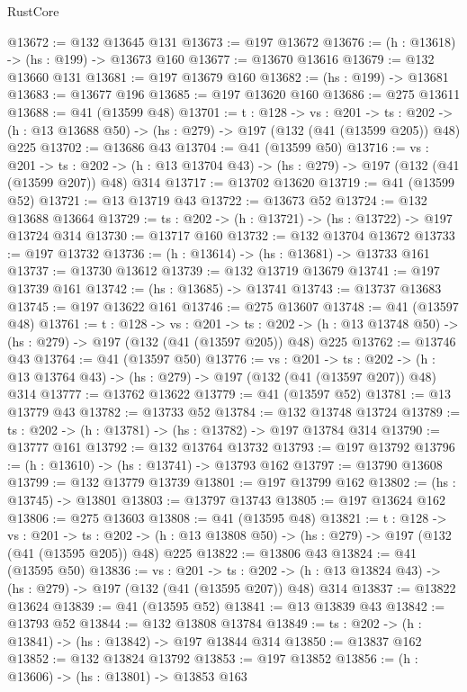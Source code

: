 \begin{lexlean}{RustCore}
\begin{coremodule}
@13672 := @132 @13645 @131
@13673 := @197 @13672
@13676 := (h : @13618) -> (hs : @199) -> @13673 @160
@13677 := @13670 @13616
@13679 := @132 @13660 @131
@13681 := @197 @13679 @160
@13682 := (hs : @199) -> @13681
@13683 := @13677 @196
@13685 := @197 @13620 @160
@13686 := @275 @13611
@13688 := @41 (@13599 @48)
@13701 := {t : @128} ->
  {vs : @201} ->
  {ts : @202} -> (h : @13 @13688 @50) -> (hs : @279) -> @197 (@132 (@41 (@13599 @205)) @48) @225
@13702 := @13686 @43
@13704 := @41 (@13599 @50)
@13716 := {vs : @201} ->
  {ts : @202} -> (h : @13 @13704 @43) -> (hs : @279) -> @197 (@132 (@41 (@13599 @207)) @48) @314
@13717 := @13702 @13620
@13719 := @41 (@13599 @52)
@13721 := @13 @13719 @43
@13722 := @13673 @52
@13724 := @132 @13688 @13664
@13729 := {ts : @202} -> (h : @13721) -> (hs : @13722) -> @197 @13724 @314
@13730 := @13717 @160
@13732 := @132 @13704 @13672
@13733 := @197 @13732
@13736 := (h : @13614) -> (hs : @13681) -> @13733 @161
@13737 := @13730 @13612
@13739 := @132 @13719 @13679
@13741 := @197 @13739 @161
@13742 := (hs : @13685) -> @13741
@13743 := @13737 @13683
@13745 := @197 @13622 @161
@13746 := @275 @13607
@13748 := @41 (@13597 @48)
@13761 := {t : @128} ->
  {vs : @201} ->
  {ts : @202} -> (h : @13 @13748 @50) -> (hs : @279) -> @197 (@132 (@41 (@13597 @205)) @48) @225
@13762 := @13746 @43
@13764 := @41 (@13597 @50)
@13776 := {vs : @201} ->
  {ts : @202} -> (h : @13 @13764 @43) -> (hs : @279) -> @197 (@132 (@41 (@13597 @207)) @48) @314
@13777 := @13762 @13622
@13779 := @41 (@13597 @52)
@13781 := @13 @13779 @43
@13782 := @13733 @52
@13784 := @132 @13748 @13724
@13789 := {ts : @202} -> (h : @13781) -> (hs : @13782) -> @197 @13784 @314
@13790 := @13777 @161
@13792 := @132 @13764 @13732
@13793 := @197 @13792
@13796 := (h : @13610) -> (hs : @13741) -> @13793 @162
@13797 := @13790 @13608
@13799 := @132 @13779 @13739
@13801 := @197 @13799 @162
@13802 := (hs : @13745) -> @13801
@13803 := @13797 @13743
@13805 := @197 @13624 @162
@13806 := @275 @13603
@13808 := @41 (@13595 @48)
@13821 := {t : @128} ->
  {vs : @201} ->
  {ts : @202} -> (h : @13 @13808 @50) -> (hs : @279) -> @197 (@132 (@41 (@13595 @205)) @48) @225
@13822 := @13806 @43
@13824 := @41 (@13595 @50)
@13836 := {vs : @201} ->
  {ts : @202} -> (h : @13 @13824 @43) -> (hs : @279) -> @197 (@132 (@41 (@13595 @207)) @48) @314
@13837 := @13822 @13624
@13839 := @41 (@13595 @52)
@13841 := @13 @13839 @43
@13842 := @13793 @52
@13844 := @132 @13808 @13784
@13849 := {ts : @202} -> (h : @13841) -> (hs : @13842) -> @197 @13844 @314
@13850 := @13837 @162
@13852 := @132 @13824 @13792
@13853 := @197 @13852
@13856 := (h : @13606) -> (hs : @13801) -> @13853 @163

\end{coremodule}
\end{lexlean}
